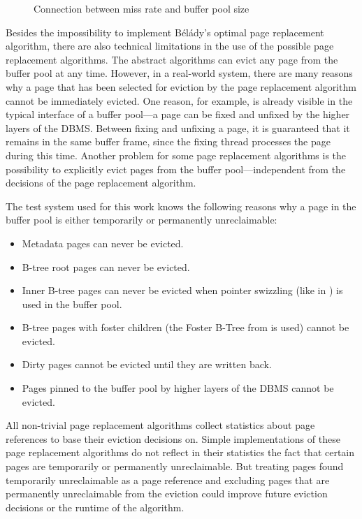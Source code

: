 \begin{@empty}
\begin{figure}[ht!]
{
        }
        \caption[Connection Between Miss Rate and Buffer Pool Size]{Connection between miss rate and buffer pool size \cite{Effelsberg:1984}}
        \label{fig:missratebufferpoolsize}
    \end{figure}
\end{@empty}

    Besides the impossibility to implement Bélády's optimal page replacement algorithm, there are also technical limitations in the use of the possible page replacement algorithms. The abstract algorithms can evict any page from the buffer pool at any time. However, in a real-world system, there are many reasons why a page that has been selected for eviction by the page replacement algorithm cannot be immediately evicted. One reason, for example, is already visible in the typical interface of a buffer pool---a page can be fixed and unfixed by the higher layers of the DBMS. Between fixing and unfixing a page, it is guaranteed that it remains in the same buffer frame, since the fixing thread processes the page during this time. Another problem for some page replacement algorithms is the possibility to explicitly evict pages from the buffer pool---independent from the decisions of the page replacement algorithm.

    The test system used for this work knows the following reasons why a page in the buffer pool is either temporarily or permanently unreclaimable:
    \begin{itemize}
        \item Metadata pages can never be evicted.
        \item B-tree root pages can never be evicted.
        \item Inner B-tree pages can never be evicted when pointer swizzling (like in \cite{Graefe:2014}) is used in the buffer pool.
        \item B-tree pages with foster children (the Foster B-Tree from \cite{Graefe:2012} is used) cannot be evicted.
        \item Dirty pages cannot be evicted until they are written back.
        \item Pages pinned to the buffer pool by higher layers of the DBMS cannot be evicted.
    \end{itemize}
    
    All non-trivial page replacement algorithms collect statistics about page references to base their eviction decisions on. Simple implementations of these page replacement algorithms do not reflect in their statistics the fact that certain pages are temporarily or permanently unreclaimable. But treating pages found temporarily unreclaimable as a page reference and excluding pages that are permanently unreclaimable from the eviction could improve future eviction decisions or the runtime of the algorithm.

